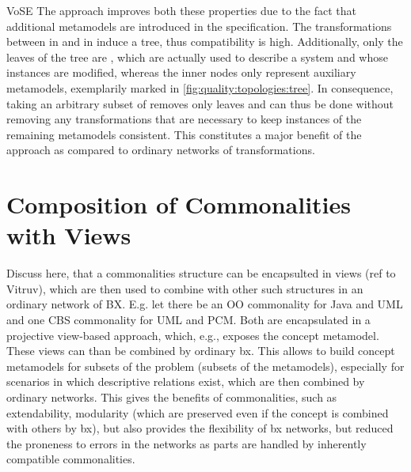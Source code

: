 \begin{copiedFrom}{VoSE}
The \commonalities approach improves both these properties due to the fact that additional metamodels are introduced in the specification.
The transformations between \metaclasses in \concretemetamodels and \commonalities in \conceptmetamodels induce a tree, thus compatibility is high.
Additionally, only the leaves of the tree are \concretemetamodels, which are actually used to describe a system and whose instances are modified, whereas the inner nodes only represent auxiliary metamodels, exemplarily marked in \autoref{fig:quality:topologies:tree}. 
In consequence, taking an arbitrary subset of \concretemetamodels removes only leaves and can thus be done without removing any transformations that are necessary to keep instances of the remaining metamodels consistent.
This constitutes a major benefit of the \commonalities approach as compared to ordinary networks of transformations.



\end{copiedFrom} %



\section{Composition of Commonalities with Views}

Discuss here, that a commonalities structure can be encapsulted in views (ref to Vitruv), which are then used to combine with other such structures in an ordinary network of BX. E.g. let there be an OO commonality for Java and UML and one CBS commonality for UML and PCM. Both are encapsulated in a projective view-based approach, which, e.g., exposes the concept metamodel. These views can than be combined by ordinary bx. This allows to build concept metamodels for subsets of the problem (subsets of the metamodels), especially for scenarios in which descriptive relations exist, which are then combined by ordinary networks. This gives the benefits of commonalities, such as extendability, modularity (which are preserved even if the concept is combined with others by bx), but also provides the flexibility of bx networks, but reduced the proneness to errors in the networks as parts are handled by inherently compatible commonalities.

